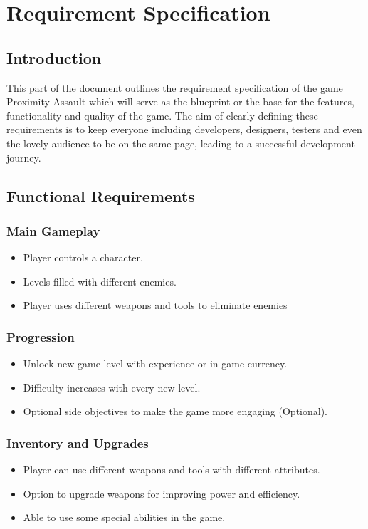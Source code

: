 \chapter{Requirement Specification}
\section{Introduction}
This part of the document outlines the requirement specification of the game Proximity Assault which will serve as the blueprint or the base for the features, functionality and quality of the game. The aim of clearly defining these requirements is to keep everyone including developers, designers, testers and even the lovely audience to be on the same page, leading to a successful development journey.
\section{Functional Requirements}
\subsection{Main Gameplay}
\begin{itemize}
\item	Player controls a character.
\item 	Levels filled with different enemies.
\item 	Player uses different weapons and tools to eliminate enemies
\end{itemize}
\subsection{Progression}
\begin{itemize}
	\item 	Unlock new game level with experience or in-game currency.
	\item 	Difficulty increases with every new level.
	\item	Optional side objectives to make the game more engaging (Optional).
\end{itemize}
\subsection{Inventory and Upgrades}
\begin{itemize}
	\item 	Player can use different weapons and tools with different attributes.
	\item 	Option to upgrade weapons for improving power and efficiency.
	\item 	Able to use some special abilities in the game.
\end{itemize}
